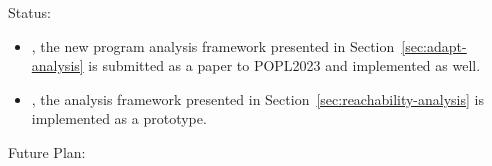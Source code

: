Status:
\begin{itemize}
    \item {}, the new program analysis framework presented in Section~\ref{sec:adapt-analysis}
 is submitted as a paper to POPL2023 and implemented as well. 
 \item {}, the analysis framework presented in Section~\ref{sec:reachability-analysis} is implemented as a prototype.
\end{itemize}
Future Plan:
